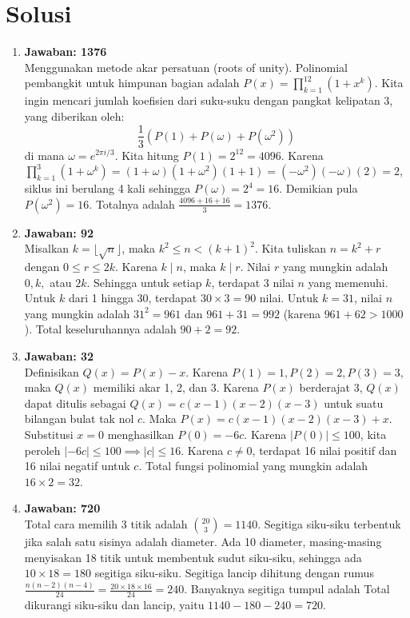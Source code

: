 \documentclass[12pt]{scrartcl}
\begin{document}
\newpage

\section*{Solusi}
\begin{enumerate}

\item \textbf{Jawaban: 1376} \\
Menggunakan metode akar persatuan (roots of unity). Polinomial pembangkit untuk himpunan bagian adalah $P(x) = \prod_{k=1}^{12} (1+x^k)$. Kita ingin mencari jumlah koefisien dari suku-suku dengan pangkat kelipatan 3, yang diberikan oleh:
$$ \frac{1}{3} \left( P(1) + P(\omega) + P(\omega^2) \right) $$
di mana $\omega = e^{2\pi i / 3}$.
Kita hitung $P(1) = 2^{12} = 4096$. Karena $\prod_{k=1}^{3} (1+\omega^k) = (1+\omega)(1+\omega^2)(1+1) = (-\omega^2)(-\omega)(2) = 2$, siklus ini berulang 4 kali sehingga $P(\omega) = 2^4 = 16$. Demikian pula $P(\omega^2) = 16$. Totalnya adalah $\frac{4096 + 16 + 16}{3} = 1376$.

\item \textbf{Jawaban: 92} \\
Misalkan $k = \lfloor \sqrt{n} \rfloor$, maka $k^2 \le n < (k+1)^2$. Kita tuliskan $n = k^2 + r$ dengan $0 \le r \le 2k$. Karena $k \mid n$, maka $k \mid r$. Nilai $r$ yang mungkin adalah $0, k,$ atau $2k$. Sehingga untuk setiap $k$, terdapat 3 nilai $n$ yang memenuhi. 
Untuk $k$ dari 1 hingga 30, terdapat $30 \times 3 = 90$ nilai. Untuk $k=31$, nilai $n$ yang mungkin adalah $31^2 = 961$ dan $961+31 = 992$ (karena $961+62 > 1000$). Total keseluruhannya adalah $90 + 2 = 92$.

\item \textbf{Jawaban: 32} \\
Definisikan $Q(x) = P(x) - x$. Karena $P(1)=1, P(2)=2, P(3)=3$, maka $Q(x)$ memiliki akar 1, 2, dan 3. Karena $P(x)$ berderajat 3, $Q(x)$ dapat ditulis sebagai $Q(x) = c(x-1)(x-2)(x-3)$ untuk suatu bilangan bulat tak nol $c$.
Maka $P(x) = c(x-1)(x-2)(x-3) + x$. Substitusi $x=0$ menghasilkan $P(0) = -6c$. Karena $|P(0)| \le 100$, kita peroleh $|-6c| \le 100 \implies |c| \le 16$. Karena $c \neq 0$, terdapat 16 nilai positif dan 16 nilai negatif untuk $c$. Total fungsi polinomial yang mungkin adalah $16 \times 2 = 32$.

\item \textbf{Jawaban: 720} \\
Total cara memilih 3 titik adalah $\binom{20}{3} = 1140$. Segitiga siku-siku terbentuk jika salah satu sisinya adalah diameter. Ada 10 diameter, masing-masing menyisakan 18 titik untuk membentuk sudut siku-siku, sehingga ada $10 \times 18 = 180$ segitiga siku-siku. 
Segitiga lancip dihitung dengan rumus $\frac{n(n-2)(n-4)}{24} = \frac{20 \times 18 \times 16}{24} = 240$. Banyaknya segitiga tumpul adalah Total dikurangi siku-siku dan lancip, yaitu $1140 - 180 - 240 = 720$.


\end{enumerate}
\end{document}
